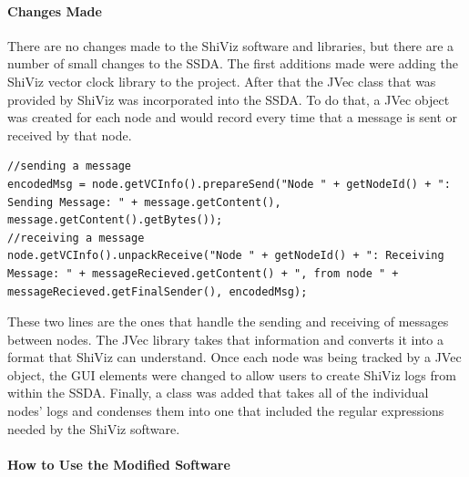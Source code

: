\documentclass[12pt, oneside]{article}   	%
\begin{document}
\paragraph{Changes Made}

There are no changes made to the ShiViz software and libraries, but there are a number of small changes to the SSDA.  The first additions made were adding the ShiViz vector clock library to the project.  After that the JVec class that was provided by ShiViz was incorporated into the SSDA.  To do that, a JVec object was created for each node and would record every time that a message is sent or received by that node. \begin{lstlisting}
//sending a message
encodedMsg = node.getVCInfo().prepareSend("Node " + getNodeId() + ": Sending Message: " + message.getContent(), message.getContent().getBytes());
//receiving a message
node.getVCInfo().unpackReceive("Node " + getNodeId() + ": Receiving Message: " + messageRecieved.getContent() + ", from node " + messageRecieved.getFinalSender(), encodedMsg);
\end{lstlisting}
These two lines are the ones that handle the sending and receiving of messages between nodes.  The JVec library takes that information and converts it into a format that ShiViz can understand.  Once each node was being tracked by a JVec object, the GUI elements were changed to allow users to create ShiViz logs from within the SSDA.  Finally, a class was added that takes all of the individual nodes' logs and condenses them into one that included the regular expressions needed by the ShiViz software.

\paragraph{How to Use the Modified Software}
\end{document}
